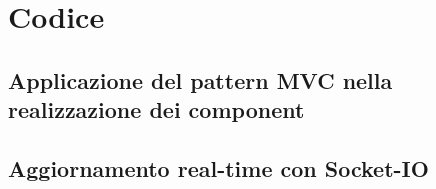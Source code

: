\section{Codice}
\subsection{Applicazione del pattern MVC nella realizzazione dei component}


\subsection{Aggiornamento real-time con Socket-IO}